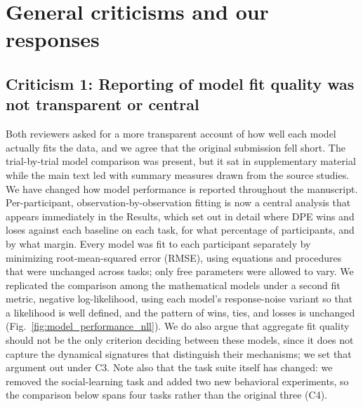 \section*{General criticisms and our responses}

\subsection*{Criticism 1: Reporting of model fit quality was not transparent or central}

Both reviewers asked for a more transparent account of how well each model actually fits the data, and we agree that the original submission fell short. The trial-by-trial model comparison was present, but it sat in supplementary material while the main text led with summary measures drawn from the source studies. We have changed how model performance is reported throughout the manuscript. Per-participant, observation-by-observation fitting is now a central analysis that appears immediately in the Results, which set out in detail where DPE wins and loses against each baseline on each task, for what percentage of participants, and by what margin. Every model was fit to each participant separately by minimizing root-mean-squared error (RMSE), using equations and procedures that were unchanged across tasks; only free parameters were allowed to vary. We replicated the comparison among the mathematical models under a second fit metric, negative log-likelihood, using each model's response-noise variant so that a likelihood is well defined, and the pattern of wins, ties, and losses is unchanged (Fig.~\ref{fig:model_performance_nll}). We do also argue that aggregate fit quality should not be the only criterion deciding between these models, since it does not capture the dynamical signatures that distinguish their mechanisms; we set that argument out under C3. Note also that the task suite itself has changed: we removed the social-learning task and added two new behavioral experiments, so the comparison below spans four tasks rather than the original three (C4).

